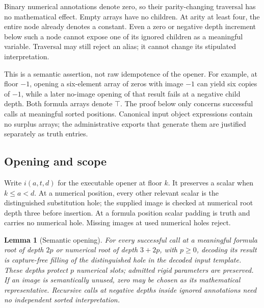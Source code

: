 \documentclass[11pt,letterpaper]{article}
\newtheorem{lemma}[theorem]{Lemma}
\theoremstyle{definition}\newtheorem{definition}[theorem]{Definition}
\theoremstyle{remark}\newtheorem{remark}[theorem]{Remark}
\begin{document}
Binary numerical annotations denote zero, so their parity-changing
traversal has no mathematical effect.  Empty arrays have no children.
At arity at least four, the entire node already denotes a constant.
Even a zero or negative depth increment below such a node cannot expose
one of its ignored children as a meaningful variable.  Traversal may
still reject an alias; it cannot change its stipulated interpretation.

This is a semantic assertion, not raw idempotence of the opener.
For example, at floor $-1$, opening a six-element array of zeros with
image $-1$ can yield six copies of $-1$, while a later no-image opening
of that result fails at a negative child depth.  Both formula arrays
denote $\top$.  The proof below only concerns successful calls at meaningful
sorted positions.  Canonical input object expressions contain no surplus
arrays; the administrative exports that generate them are justified
separately as truth entries.

\subsection{Opening and scope}
\label{subsec:opening-lemma}

Write $i(a,t,d)$ for the executable opener at floor $k$.  It preserves a
scalar when $k\leq a<d$.  At a numerical position, every other relevant
scalar is the distinguished substitution hole; the supplied image is
checked at numerical root depth three before insertion.  At a formula
position scalar padding is truth and carries no numerical hole.
Missing images at used numerical holes reject.

\begin{lemma}[Semantic opening]
\label{lem:semantic-opening}
For every successful call at a meaningful formula root of depth $2p$
or numerical root of depth $3+2p$, with $p\geq0$, decoding its result
is capture-free filling of the distinguished hole in the decoded input
template.  These depths protect $p$ numerical slots; admitted rigid
parameters are preserved.  If an image is semantically unused, zero
may be chosen as its mathematical representative.  Recursive calls
at negative depths inside ignored annotations need no independent
sorted interpretation.
\end{lemma}
\end{document}
